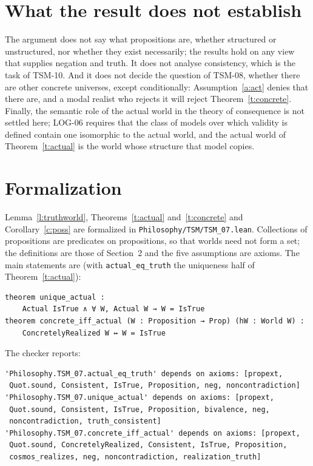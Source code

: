 \documentclass{situationist-preprint}
\begin{document}
\section{What the result does not establish}

The argument does not say what propositions are, whether structured or unstructured, nor whether they exist necessarily; the results hold on any view that supplies negation and truth. It does not analyse consistency, which is the task of TSM-10. And it does not decide the question of TSM-08, whether there are other concrete universes, except conditionally: Assumption~\ref{a:act} denies that there are, and a modal realist who rejects it will reject Theorem~\ref{t:concrete}. Finally, the semantic role of the actual world in the theory of consequence is not settled here; LOG-06 requires that the class of models over which validity is defined contain one isomorphic to the actual world, and the actual world of Theorem~\ref{t:actual} is the world whose structure that model copies.

\section{Formalization}\label{s:formal}

Lemma~\ref{l:truthworld}, Theorems~\ref{t:actual} and~\ref{t:concrete} and Corollary~\ref{c:poss} are formalized in \nolinkurl{Philosophy/TSM/TSM_07.lean}. Collections of propositions are predicates on propositions, so that worlds need not form a set; the definitions are those of Section~2 and the five assumptions are axioms. The main statements are (with \texttt{actual\_eq\_truth} the uniqueness half of Theorem~\ref{t:actual}):

\begin{lstlisting}
theorem unique_actual :
    Actual IsTrue ∧ ∀ W, Actual W → W = IsTrue
theorem concrete_iff_actual (W : Proposition → Prop) (hW : World W) :
    ConcretelyRealized W ↔ W = IsTrue
\end{lstlisting}

The checker reports:

\begin{lstlisting}
'Philosophy.TSM_07.actual_eq_truth' depends on axioms: [propext,
 Quot.sound, Consistent, IsTrue, Proposition, neg, noncontradiction]
'Philosophy.TSM_07.unique_actual' depends on axioms: [propext,
 Quot.sound, Consistent, IsTrue, Proposition, bivalence, neg,
 noncontradiction, truth_consistent]
'Philosophy.TSM_07.concrete_iff_actual' depends on axioms: [propext,
 Quot.sound, ConcretelyRealized, Consistent, IsTrue, Proposition,
 cosmos_realizes, neg, noncontradiction, realization_truth]
\end{lstlisting}
\end{document}
